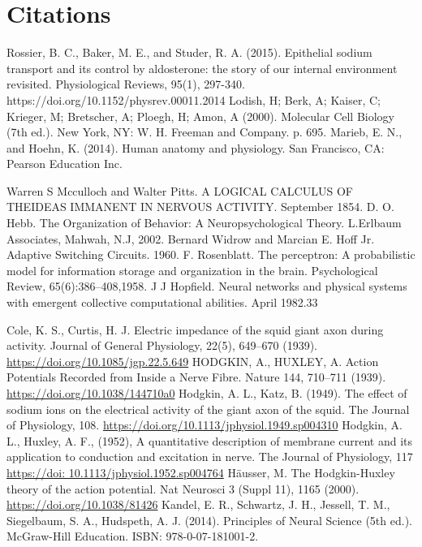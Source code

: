 \documentclass[12pt,a4paper]{report}
\begin{document}
\chapter{Citations}

\begin{thebibliography}{9}
      Rossier, B. C., Baker, M. E., and Studer, R. A. (2015). Epithelial sodium transport and its control by aldosterone: the story of our internal environment revisited. Physiological Reviews, 95(1), 297-340. https://doi.org/10.1152/physrev.00011.2014
      Lodish, H; Berk, A; Kaiser, C; Krieger, M; Bretscher, A; Ploegh, H; Amon, A (2000). Molecular Cell Biology (7th ed.). New York, NY: W. H. Freeman and Company. p. 695.
      Marieb, E. N., and Hoehn, K. (2014). Human anatomy and physiology. San Francisco, CA: Pearson Education Inc.

     Warren S Mcculloch and Walter Pitts. A LOGICAL CALCULUS OF THEIDEAS IMMANENT IN NERVOUS ACTIVITY. September 1854.
     D. O. Hebb. The Organization of Behavior: A Neuropsychological Theory. L.Erlbaum Associates, Mahwah, N.J, 2002.
     Bernard Widrow and Marcian E. Hoff Jr. Adaptive Switching Circuits. 1960.
     F. Rosenblatt. The perceptron: A probabilistic model for information storage and organization in the brain. Psychological Review, 65(6):386–408,1958.
     J J Hopfield. Neural networks and physical systems with emergent collective computational abilities. April 1982.33
    
     Cole, K. S., Curtis, H. J. Electric impedance of the squid giant axon during activity. Journal of General Physiology, 22(5), 649–670 (1939). 
    \url{https://doi.org/10.1085/jgp.22.5.649}
    HODGKIN, A., HUXLEY, A. Action Potentials Recorded from Inside a Nerve Fibre. Nature 144, 710–711 (1939).
    \url{https://doi.org/10.1038/144710a0}
     Hodgkin, A. L., Katz, B. (1949). The effect of sodium ions on the electrical activity of the giant axon of the squid. The Journal of Physiology, 108. 
    \url{https://doi.org/10.1113/jphysiol.1949.sp004310}
     Hodgkin, A. L., Huxley, A. F., (1952), A quantitative description of membrane current and its application to conduction and excitation in nerve. The Journal of Physiology, 117 
    \url{https://doi: 10.1113/jphysiol.1952.sp004764}
     Häusser, M. The Hodgkin-Huxley theory of the action potential. Nat Neurosci 3 (Suppl 11), 1165 (2000). \url{https://doi.org/10.1038/81426}
    Kandel, E. R., Schwartz, J. H., Jessell, T. M., Siegelbaum, S. A., Hudspeth, A. J. (2014). Principles of Neural Science (5th ed.). McGraw-Hill Education. ISBN: 978-0-07-181001-2.



\end{thebibliography}
\end{document}
